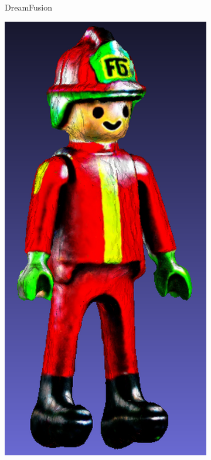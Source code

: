 \begin{figure}[ht]
\begin{subfigure}[b]{0.18\textwidth}
        \caption{DreamFusion}
    \end{subfigure}
    \begin{subfigure}[b]{0.179\textwidth}
        \centering
        \includegraphics[width=\textwidth]{figures/subjective/magic3d_playmobil_result_resize.png}

\end{subfigure}
\end{figure}
